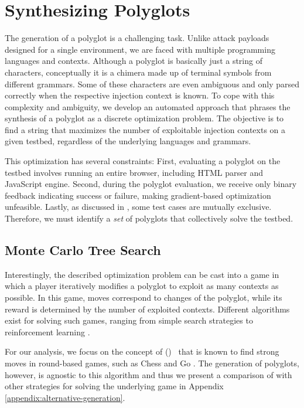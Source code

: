 \section{Synthesizing Polyglots}\label{sec:generation}
The generation of a polyglot is a challenging task. 
Unlike attack payloads designed for a single environment, we are faced with multiple programming languages and contexts.
Although a polyglot is basically just a string of characters, conceptually it is a chimera made up of terminal symbols from different grammars. Some of these characters are even ambiguous and only parsed correctly when the respective injection context is known.
To cope with this complexity and ambiguity, we develop an automated approach that phrases the synthesis of a polyglot as a discrete optimization problem.
The objective is to find a string that maximizes the number of exploitable injection contexts on a given testbed, regardless of the underlying languages and grammars.

This optimization has several constraints:
First, evaluating a polyglot on the testbed involves running an entire browser, including HTML parser and JavaScript engine.
Second, during the polyglot evaluation, we receive only binary feedback indicating success or failure, making gradient-based optimization unfeasible.
Lastly, as discussed in , some test cases are mutually exclusive. Therefore, we must identify a \emph{set} of polyglots that collectively solve the testbed.


\subsection{Monte Carlo Tree Search}%
\label{sec:mcts}%

Interestingly, the described optimization problem can be cast into a game in which a player iteratively modifies a polyglot to exploit as many contexts as possible. In this game, moves correspond to changes of the polyglot, while its reward is determined by the number of exploited contexts. Different algorithms exist for solving such games, ranging from simple search strategies to reinforcement learning \cite{russell2010artificial}.

For our analysis, we focus on the concept of \montecarlo{} (\mcts{})~\cite[][]{browneMcts:2012} that is known to find strong moves in round-based games, such as Chess and Go \cite{silver2016mastering}. The generation of polyglots, however, is agnostic to this algorithm and thus we present a comparison of \mcts{} with other strategies for solving the underlying game in Appendix \ref{appendix:alternative-generation}. %

